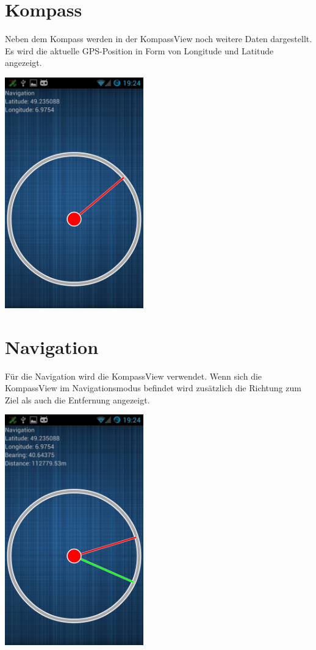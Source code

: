 \section{Kompass}
Neben dem Kompass werden in der KompassView noch weitere Daten dargestellt. Es wird die aktuelle GPS-Position in Form von Longitude und Latitude angezeigt.

\begin{capfigure}
	\includegraphics[width=6cm]{images/app/compass}
\end{capfigure}

\section{Navigation}
Für die Navigation wird die KompassView verwendet. Wenn sich die KompassView im Navigationsmodus befindet wird zusätzlich die Richtung zum Ziel als auch die Entfernung angezeigt.

\begin{capfigure}
	\includegraphics[width=6cm]{images/app/navigation}
\end{capfigure}

